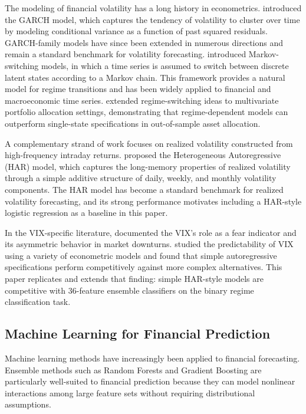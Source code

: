 \documentclass[12pt]{article}
\begin{document}
The modeling of financial volatility has a long history in econometrics.
\citet{bollerslev1986} introduced the GARCH model, which captures the tendency of volatility
to cluster over time by modeling conditional variance as a function of past squared residuals.
GARCH-family models have since been extended in numerous directions and remain a standard
benchmark for volatility forecasting. \citet{hamilton1989} introduced Markov-switching models,
in which a time series is assumed to switch between discrete latent states according to a Markov
chain. This framework provides a natural model for regime transitions and has been widely applied
to financial and macroeconomic time series. \citet{guidolin2007} extended regime-switching ideas
to multivariate portfolio allocation settings, demonstrating that regime-dependent models can
outperform single-state specifications in out-of-sample asset allocation.

A complementary strand of work focuses on realized volatility constructed from high-frequency
intraday returns. \citet{corsi2009} proposed the Heterogeneous Autoregressive (HAR) model, which
captures the long-memory properties of realized volatility through a simple additive structure of
daily, weekly, and monthly volatility components. The HAR model has become a standard benchmark
for realized volatility forecasting, and its strong performance motivates including a HAR-style
logistic regression as a baseline in this paper.

In the VIX-specific literature, \citet{whaley2009} documented the VIX's role as a fear indicator
and its asymmetric behavior in market downturns. \citet{fernandes2014} studied the predictability
of VIX using a variety of econometric models and found that simple autoregressive specifications
perform competitively against more complex alternatives. This paper replicates and extends that
finding: simple HAR-style models are competitive with 36-feature ensemble classifiers on the
binary regime classification task.

\subsection{Machine Learning for Financial Prediction}

Machine learning methods have increasingly been applied to financial forecasting. Ensemble methods
such as Random Forests \citep{breiman2001} and Gradient Boosting are particularly well-suited to
financial prediction because they can model nonlinear interactions among large feature sets without
requiring distributional assumptions.
\end{document}
